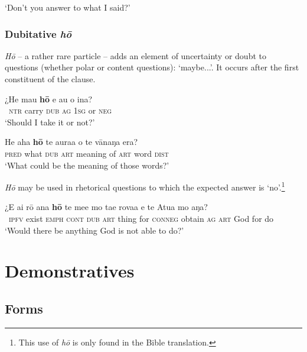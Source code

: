 \glt 
‘Don’t you answer to what I said?’ \textstyleExampleref{[R315.264]} 
\z
{}

\subsubsection[Dubitative hō]{Dubitative \textit{hō}}\label{sec:4.5.4.6}

\textit{Hō} – a rather rare particle – adds an element of uncertainty or doubt to questions (whether polar or content questions): ‘maybe...’. It occurs after the first constituent of the clause.

\ea\label{ex:4.189}
\gll ¿He ma{\ꞌ}u \textbf{hō} e au {\ꞌ}o {\ꞌ}ina? \\
~\textsc{ntr} carry \textsc{dub} \textsc{ag} \textsc{1sg} or \textsc{neg} \\

\glt 
‘Should I take it or not?’ \textstyleExampleref{[R460.002]} 
\z

\ea\label{ex:4.190}
\gll He aha \textbf{hō} te aura{\ꞌ}a o te vānaŋa era?\\
\textsc{pred} what \textsc{dub} \textsc{art} meaning of \textsc{art} word \textsc{dist}\\

\glt
‘What could be the meaning of those words?’ \textstyleExampleref{[Luke 1:29]}
\z

\textit{Hō} may be used in rhetorical questions to which the expected answer is ‘no’.\footnote{\label{fn:208}This use of \textit{hō} is only found in the Bible translation.} 

\ea\label{ex:4.191}
\gll ¿E ai rō {\ꞌ}ana \textbf{hō} te me{\ꞌ}e mo ta{\ꞌ}e rova{\ꞌ}a e te {\ꞌ}Atua mo aŋa? \\
~\textsc{ipfv} exist \textsc{emph} \textsc{cont} \textsc{dub} \textsc{art} thing for \textsc{conneg} obtain \textsc{ag} \textsc{art} God for do \\

\glt 
‘Would there be anything God is not able to do?’ \textstyleExampleref{[Gen. 18:14]}
\z
{}
\section{Demonstratives}\label{sec:4.6}
\subsection{Forms}\label{sec:4.6.1}

